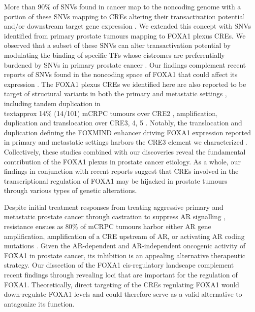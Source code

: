 More than 90\% of SNVs found in cancer map to the noncoding genome \cite{meltonRecurrentSomaticMutations2015,mazrooeiCistromePartitioningReveals2019} with a portion of these SNVs mapping to CREs altering their transactivation potential \cite{baileyNoncodingSomaticInherited2016,zhangIntegrativeFunctionalGenomics2012,huangHighlyRecurrentTERT2013,hornTERTPromoterMutations2013} and/or downstream target gene expression \cite{zhouEmergenceNoncodingCancer2016,meltonRecurrentSomaticMutations2015,weinholdGenomewideAnalysisNoncoding2014}.
We extended this concept with SNVs identified from primary prostate tumours mapping to FOXA1 plexus CREs.
We observed that a subset of these SNVs can alter transactivation potential by modulating the binding of specific TFs whose cistromes are preferentially burdened by SNVs in primary prostate cancer \cite{mazrooeiCistromePartitioningReveals2019}.
Our findings complement recent reports of SNVs found in the noncoding space of FOXA1 that could affect its expression \cite{annalaFrequentMutationFOXA12018,camcapstudygroupSequencingProstateCancers2018}.
The FOXA1 plexus CREs we identified here are also reported to be target of structural variants in both the primary and metastatic settings \cite{paroliaDistinctStructuralClasses2019,quigleyGenomicHallmarksStructural2018}, including tandem duplication in \\textapprox 14\% (14/101) mCRPC tumours over CRE2 \cite{quigleyGenomicHallmarksStructural2018}, amplification, duplication and translocation over CRE3, 4, 5 \cite{paroliaDistinctStructuralClasses2019}.
Notably, the translocation and duplication defining the FOXMIND enhancer driving FOXA1 expression reported in primary and metastatic settings harbors the CRE3 element we characterized \cite{paroliaDistinctStructuralClasses2019}.
Collectively, these studies combined with our discoveries reveal the fundamental contribution of the FOXA1 plexus in prostate cancer etiology.
As a whole, our findings in conjunction with recent reports suggest that CREs involved in the transcriptional regulation of FOXA1 may be hijacked in prostate tumours through various types of genetic alterations.

Despite initial treatment responses from treating aggressive primary and metastatic prostate cancer through castration to suppress AR signalling \cite{attardProstateCancer2016}, resistance ensues as 80\% of mCRPC tumours harbor either AR gene amplification, amplification of a CRE upstream of AR, or activating AR coding mutations \cite{robinsonIntegrativeClinicalGenomics2015,takedaSomaticallyAcquiredEnhancer2018,quigleyGenomicHallmarksStructural2018}.
Given the AR-dependent \cite{yangCurrentPerspectivesFOXA12015,pomerantzAndrogenReceptorCistrome2015} and AR-independent \cite{sunkelIntegrativeAnalysisIdentifies2017} oncogenic activity of FOXA1 in prostate cancer, its inhibition is an appealing alternative therapeutic strategy.
Our dissection of the FOXA1 cis-regulatory landscape complement recent findings through revealing loci that are important for the regulation of FOXA1.
Theoretically, direct targeting of the CREs regulating FOXA1 would down-regulate FOXA1 levels and could therefore serve as a valid alternative to antagonize its function.


